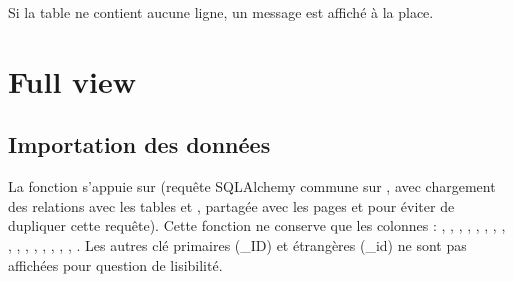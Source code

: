 \documentclass[letterpaper,10pt,english]{sphinxmanual}
\begin{document}
\sphinxAtStartPar
Si la table ne contient aucune ligne, un message 
est affiché à la place.


\section{Full view}
\label{\detokenize{2_BacLipidDB:full-view}}

\subsection{Importation des données}
\label{\detokenize{2_BacLipidDB:importation-des-donnees}}
\sphinxAtStartPar
La fonction  s’appuie sur 
(requête SQLAlchemy commune sur , avec chargement des relations avec les tables
 et , partagée avec les pages  et  pour éviter de
dupliquer cette requête). Cette fonction ne conserve que les colonnes :
, , , , ,
, , , , ,
, , , , ,
, . Les autres clé primaires (\_ID) et étrangères (\_id) ne sont pas affichées pour question de lisibilité.
\end{document}
